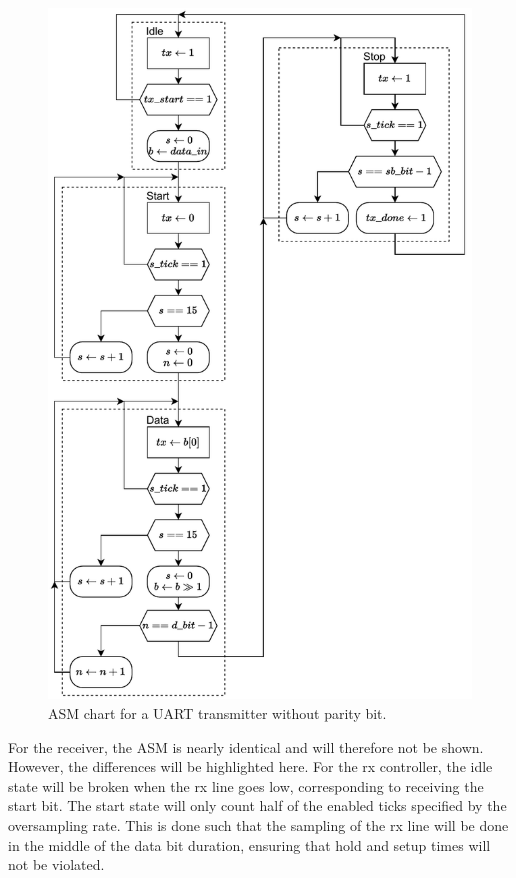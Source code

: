 \documentclass[./dissertation.tex]{subfiles}
\begin{document}
\begin{figure}[H]
    \centering
    \includegraphics[scale=.9]{subfiles/imgs/IP_Blocks_Pics/UART_tx.drawio.pdf}
    \caption{ASM chart for a UART transmitter without parity bit.}
    \label{fig:uart_tx_asm}
\end{figure}

For the receiver, the ASM is nearly identical and will therefore not be shown. However, the differences will be highlighted here. For the rx controller, the idle state will be broken when the rx line goes low, corresponding to receiving the start bit. The start state will only count half of the enabled ticks specified by the oversampling rate. This is done such that the sampling of the rx line will be done in the middle of the data bit duration, ensuring that hold and setup times will not be violated. 
\end{document}
